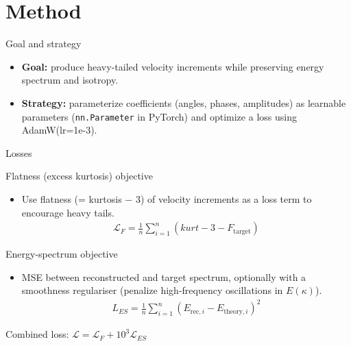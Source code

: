 \documentclass[11pt]{beamer}
\begin{document}
\section{Method}
\begin{frame}{Goal and strategy}
  \begin{itemize}
    \item \textbf{Goal:} produce heavy-tailed velocity increments while preserving energy spectrum and isotropy.
    \item \textbf{Strategy:} parameterize coefficients (angles, phases, amplitudes) as learnable parameters (\texttt{nn.Parameter} in PyTorch) and optimize a loss using AdamW(lr=1e-3).
  \end{itemize}

\end{frame}

\begin{frame}{Losses}
  \begin{block}{Flatness (excess kurtosis) objective}
    \begin{itemize}
      \item Use flatness (= kurtosis $-$ 3) of velocity increments as a loss term to encourage heavy tails.
      \begin{align}
        \mathcal{L}_F = \frac{1}{n}\sum_{i=1}^{n}(kurt-3-F_\text{target})
      \end{align}
    \end{itemize}
  \end{block}
  \begin{block}{Energy-spectrum objective}
    \begin{itemize}
      \item MSE between reconstructed and target spectrum, optionally with a smoothness regulariser (penalize high-frequency oscillations in $E(\kappa)$).
      \begin{align}
        L_{ES} = \frac{1}{n}\sum_{i=1}^{n}(E_{\text{rec},i}-E_{\text{theory},i})^2
      \end{align}
    \end{itemize}
  \end{block}
  \vfill
  \centering Combined loss: $\mathcal{L}=\mathcal{L}_F + 10^3\mathcal{L}_{ES}$
\end{frame}
\end{document}
